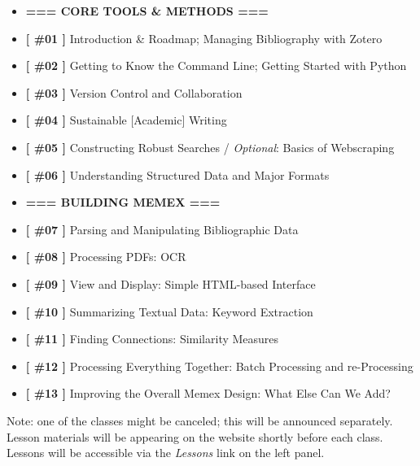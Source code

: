 \documentclass[
]{book}
\providecommand{\tightlist}{%
  \setlength{\itemsep}{0pt}\setlength{\parskip}{0pt}}
\begin{document}
\begin{itemize}
\tightlist
\item
  \textbf{=== CORE TOOLS \& METHODS ===}
\item
  \textbf{{[} \#01 {]}} Introduction \& Roadmap; Managing Bibliography with Zotero
\item
  \textbf{{[} \#02 {]}} Getting to Know the Command Line; Getting Started with Python
\item
  \textbf{{[} \#03 {]}} Version Control and Collaboration
\item
  \textbf{{[} \#04 {]}} Sustainable {[}Academic{]} Writing
\item
  \textbf{{[} \#05 {]}} Constructing Robust Searches / \emph{Optional}: Basics of Webscraping
\item
  \textbf{{[} \#06 {]}} Understanding Structured Data and Major Formats
\item
  \textbf{=== BUILDING MEMEX ===}
\item
  \textbf{{[} \#07 {]}} Parsing and Manipulating Bibliographic Data
\item
  \textbf{{[} \#08 {]}} Processing PDFs: OCR
\item
  \textbf{{[} \#09 {]}} View and Display: Simple HTML-based Interface
\item
  \textbf{{[} \#10 {]}} Summarizing Textual Data: Keyword Extraction
\item
  \textbf{{[} \#11 {]}} Finding Connections: Similarity Measures
\item
  \textbf{{[} \#12 {]}} Processing Everything Together: Batch Processing and re-Processing
\item
  \textbf{{[} \#13 {]}} Improving the Overall Memex Design: What Else Can We Add?
\end{itemize}

Note: one of the classes might be canceled; this will be announced separately. Lesson materials will be appearing on the website shortly before each class. Lessons will be accessible via the \emph{Lessons} link on the left panel.

  
\end{document}
